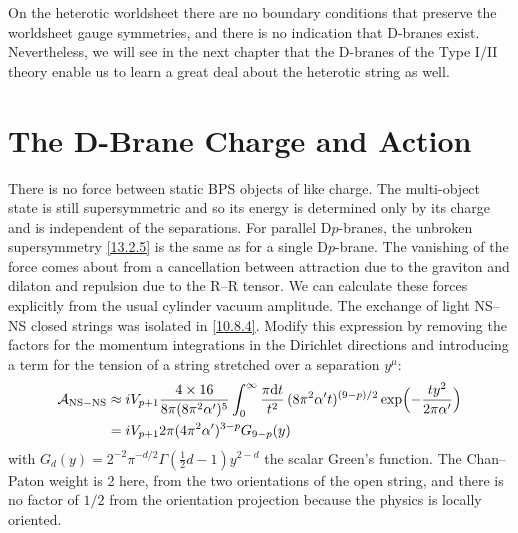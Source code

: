 On the heterotic worldsheet there are no boundary conditions that preserve the worldsheet gauge symmetries, and there is no indication that D-branes exist. Nevertheless, we will see in the next chapter that the D-branes of the Type I/II theory enable us to learn a great deal about the heterotic string as well.


\section{The D-Brane Charge and Action}

There is no force between static BPS objects of like charge. The multi-object state is still supersymmetric and so its energy is determined only by its charge and is independent of the separations. For parallel D$p$-branes, the unbroken supersymmetry \eqref{13.2.5} is the same as for a single D$p$-brane. The vanishing of the force comes about from a cancellation between attraction due to the graviton and dilaton and repulsion due to the R--R tensor. We can calculate these forces explicitly from the usual cylinder vacuum amplitude. The exchange of light NS--NS closed strings was isolated in \eqref{10.8.4}. Modify this expression by removing the factors for the momentum integrations in the Dirichlet directions and introducing a term for the tension of a string stretched over a separation $y^\mu$:
\begin{align}
	\mathcal{A}_{\mathrm{NS-NS}} &\approx i V_{p+1}\frac{4\times 16}{8\pi(8\pi^2\alpha')^5}\int_0^\infty \frac{\pi\mathrm{d} t}{t^2}\,(8\pi^2\alpha' t)^{(9-p)/2}\exp\Bigl(-\frac{t y^2}{2\pi\alpha'}\Bigr) \nonumber \\
	&= i V_{p+1} 2\pi(4\pi^2\alpha')^{3-p}G_{9-p}(y) \label{13.3.1}
\end{align}
with $G_d(y) = 2^{-2}\pi^{-d/2}\Gamma(\frac{1}{2}d - 1)y^{2-d}$ the scalar Green's function. The Chan--Paton weight is 2 here, from the two orientations of the open string, and there is no factor of $1/2$ from the orientation projection because the physics is locally oriented.
